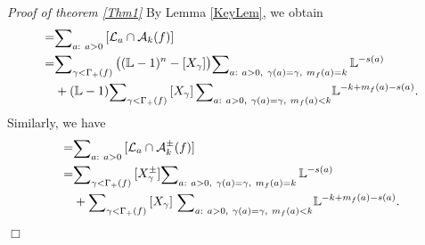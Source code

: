 \documentclass[12pt,a4paper,leqno]{amsart}
\theoremstyle{definition}
\begin{document}
\textit{Proof of theorem \ref{Thm1}}
By Lemma \ref{KeyLem}, we obtain
\begin{align*}
[\mathcal A_k(f)]
=&
{\mathop{\textrm{\scriptsize $\mathop\sum$}}}_{a:\ a>0}\,
[\mathcal L_a\cap\mathcal A_k(f)]\\
=&
{\mathop{\textrm{\scriptsize $\mathop\sum$}}}_{\gamma < \Gamma_+(f)}\,
\bigl(({\mathbb{L}}-1)^{n}-[X_{\gamma}]\bigr)
{\mathop{\textrm{\scriptsize $\mathop\sum$}}}_{a:\ a>0, ~\gamma(a)=\gamma,\ m_f(a)=k}\,{\mathbb{L}}^{-s(a)}\\
&+
({\mathbb{L}}-1)
{\mathop{\textrm{\scriptsize $\mathop\sum$}}}_{\gamma < \Gamma_+(f)}\,[X_{\gamma}]\,
{\mathop{\textrm{\scriptsize $\mathop\sum$}}}_{a:\ a>0,~\gamma(a)=\gamma,\ m_f(a)<k}
{\mathbb{L}}^{-k+m_f(a)-s(a)}. 
\end{align*}
Similarly, we have 
\begin{align*}
[\mathcal A_k^\pm(f)]
=&
{\mathop{\textrm{\scriptsize $\mathop\sum$}}}_{a:\ a>0}\,
[\mathcal L_a\cap\mathcal A_k^\pm(f)]\\
=&
{\mathop{\textrm{\scriptsize $\mathop\sum$}}}_{\gamma < \Gamma_+(f)}\,
[X_{\gamma}^\pm]
{\mathop{\textrm{\scriptsize $\mathop\sum$}}}_{a:\ a>0,~\gamma(a)=\gamma,\ m_f(a)=k}\, 
{\mathbb{L}}^{-s(a)}\\
&+
{\mathop{\textrm{\scriptsize $\mathop\sum$}}}_{\gamma < \Gamma_+(f)}\,
[X_{\gamma}]\ 
{\mathop{\textrm{\scriptsize $\mathop\sum$}}}_{a:\ a>0,~\gamma(a)=\gamma,\ m_f(a)<k}
{\mathbb{L}}^{-k+m_f(a)-s(a)}. 
\end{align*}
\begin{flushright} $\Box$ \end{flushright}
\end{document}
